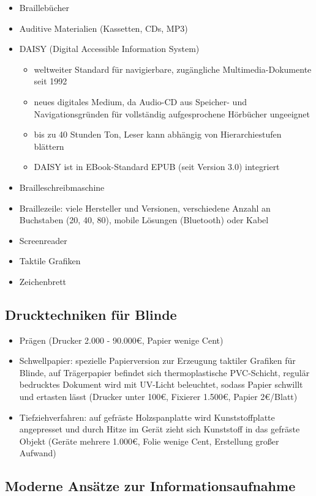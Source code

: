 \documentclass[paper=a4, fontsize=11pt]{scrartcl} %
\numberwithin{equation}{section} %
\numberwithin{figure}{section} %
\numberwithin{table}{section} %
\begin{document}
\begin{itemize}
\item Braillebücher
\item Auditive Materialien (Kassetten, CDs, MP3)
\item DAISY (Digital Accessible Information System)
\begin{itemize}
\item weltweiter Standard für navigierbare, zugängliche Multimedia-Dokumente seit 1992
\item neues digitales Medium, da Audio-CD aus Speicher- und Navigationsgründen für vollständig aufgesprochene Hörbücher ungeeignet
\item bis zu 40 Stunden Ton, Leser kann abhängig von Hierarchiestufen blättern
\item DAISY ist in EBook-Standard EPUB (seit Version 3.0) integriert
\end{itemize}
\item Brailleschreibmaschine
\item Braillezeile: viele Hersteller und Versionen, verschiedene Anzahl an Buchstaben (20, 40, 80), mobile Lösungen (Bluetooth) oder Kabel
\item Screenreader
\item Taktile Grafiken
\item Zeichenbrett
\end{itemize}

\subsection{Drucktechniken für Blinde}

\begin{itemize}
\item Prägen (Drucker 2.000 - 90.000€, Papier wenige Cent)
\item Schwellpapier: spezielle Papierversion zur Erzeugung taktiler Grafiken für Blinde, auf Trägerpapier befindet sich thermoplastische PVC-Schicht, regulär bedrucktes Dokument wird mit UV-Licht beleuchtet, sodass Papier schwillt und ertasten lässt (Drucker unter 100€, Fixierer 1.500€, Papier 2€/Blatt)
\item Tiefziehverfahren: auf gefräste Holzspanplatte wird Kunststoffplatte angepresset und durch Hitze im Gerät zieht sich Kunststoff in das gefräste Objekt (Geräte mehrere 1.000€, Folie wenige Cent, Erstellung großer Aufwand)
\end{itemize}

\subsection{Moderne Ansätze zur Informationsaufnahme}
\end{document}
